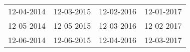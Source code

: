 \begin{supertabular}{llll}
 12-04-2014 &  12-03-2015 &  12-02-2016 &  12-01-2017 \\
 12-05-2014 &  12-05-2015 &  12-03-2016 &  12-02-2017 \\
 12-06-2014 &  12-06-2015 &  12-04-2016 &  12-03-2017 \\
\end{supertabular}
